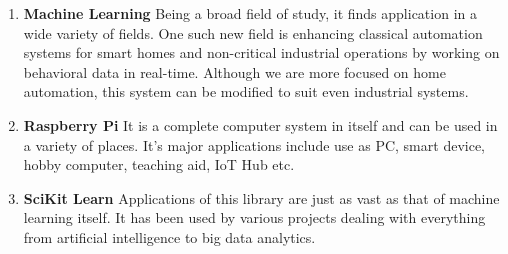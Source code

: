 \begin{enumerate}
\item \textbf{Machine Learning}
Being a broad field of study, it finds application in a wide variety of fields. One such new field is enhancing classical automation systems for smart homes and non-critical industrial operations by working on behavioral data in real-time. Although we are more focused on home automation, this system can be modified to suit even industrial systems.

\item \textbf{Raspberry Pi}
It is a complete computer system in itself and can be used in a variety of places. It's major applications include use as PC, smart device, hobby computer, teaching aid, IoT Hub etc.

\item \textbf{SciKit Learn}
Applications of this library are just as vast as that of machine learning itself. It has been used by various projects dealing with everything from artificial intelligence to big data analytics.
\end{enumerate}
